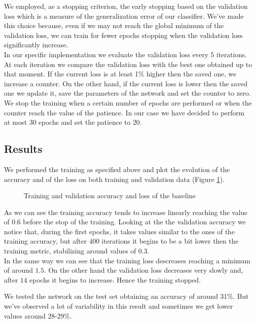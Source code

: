 \documentclass[12pt, a4paper]{report}
\begin{document}
We employed, as a stopping criterion, the early stopping based on the validation loss which is a measure of the generalization error of our classifier. We've made this choice because, even if we may not reach the global minimum of the validation loss, we can train for fewer epochs stopping when the validation loss significantly increase.\\
In our specific implementation we evaluate the validation loss every 5 iterations. At each iteration we compare the validation loss with the best one obtained up to that moment. If the current loss is at least 1\% higher then the saved one, we increase a counter. On the other hand, if the current loss is lower then the saved one we update it, save the parameters of the network and set the counter to zero. We stop the training when a certain number of epochs are performed or when the counter reach the value of the patience. In our case we have decided to perform at most $30$ epochs and set the patience to $20$.
	
\subsection*{Results}

We performed the training as specified above and plot the evolution of the accuracy and of the loss on both training and validation data (Figure \ref{fig:baseline}).

\begin{figure}[h!]
	\centering
	\caption{Training and validation accuracy and loss of the baseline}
	\label{fig:baseline}
\end{figure}

As we can see the training accuracy tends to increase linearly reaching the value of 0.6 before the stop of the training. Looking at the the validation accuracy we notice that, during the first epochs, it takes values similar to the ones of the training accuracy, but after $400$ iterations it begins to be a bit lower then the training metric, stabilizing around values of 0.3.\\
In the same way we can see that the training loss descreases reaching a minimum of around $1.5$. On the other hand the validation loss decreases very slowly and, after $14$ epochs it begins to increase. Hence the training stopped.

We tested the network on the test set obtaining an accuracy of around 31\%. But we've observed a lot of variability in this result and sometimes we get lower values around 28-29\%. 
\end{document}
